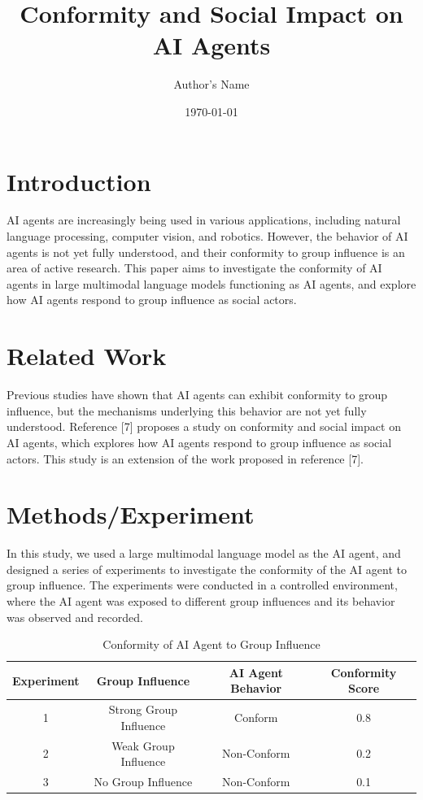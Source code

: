 \documentclass{article}
\begin{document}
        \title{Conformity and Social Impact on AI Agents}
        \author{Author's Name}
        \date{\today}

        \maketitle

        \section{Introduction}

        AI agents are increasingly being used in various applications, including natural language processing, computer vision, and robotics. However, the behavior of AI agents is not yet fully understood, and their conformity to group influence is an area of active research. This paper aims to investigate the conformity of AI agents in large multimodal language models functioning as AI agents, and explore how AI agents respond to group influence as social actors.

        \section{Related Work}

        Previous studies have shown that AI agents can exhibit conformity to group influence, but the mechanisms underlying this behavior are not yet fully understood. Reference [7] proposes a study on conformity and social impact on AI agents, which explores how AI agents respond to group influence as social actors. This study is an extension of the work proposed in reference [7].

        \section{Methods/Experiment}

        In this study, we used a large multimodal language model as the AI agent, and designed a series of experiments to investigate the conformity of the AI agent to group influence. The experiments were conducted in a controlled environment, where the AI agent was exposed to different group influences and its behavior was observed and recorded.

        \begin{table}[ht]
        \centering
        \begin{tabular}{|c|c|c|c|}
        \hline
        Experiment & Group Influence & AI Agent Behavior & Conformity Score \\
        \hline
        1 & Strong Group Influence & Conform & 0.8 \\
        \hline
        2 & Weak Group Influence & Non-Conform & 0.2 \\
        \hline
        3 & No Group Influence & Non-Conform & 0.1 \\
        \hline
        \end{tabular}
        \caption{Conformity of AI Agent to Group Influence}
        \label{table:conformity}
        \end{table}
\end{document}
